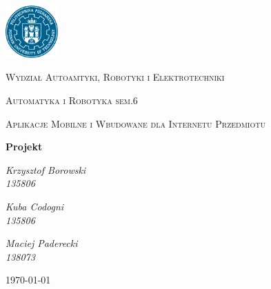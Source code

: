 \documentclass{article}
\begin{document}
	\begin{titlepage}
		\centering
		\includegraphics[width=0.15\textwidth]{logo}\par\vspace{1cm}
		{\scshape\LARGE Wydział Autoamtyki, Robotyki i Elektrotechniki\par}
		{\scshape \Large Automatyka i Robotyka sem.6 \par}
		\vspace{1cm}
		{\scshape\Large Aplikacje Mobilne i Wbudowane dla Internetu Przedmiotu\par}
		\vspace{1.5cm}
		{\huge\bfseries Projekt\par}
		\vspace{6cm}
		{\Large\itshape Krzysztof Borowski\\ 135806\par}
		{\Large\itshape Kuba Codogni\\ 135806\par}
		{\Large\itshape Maciej Paderecki\\ 138073\par}
		\vfill
		{\large \today\par}
	\end{titlepage}
\end{document}
